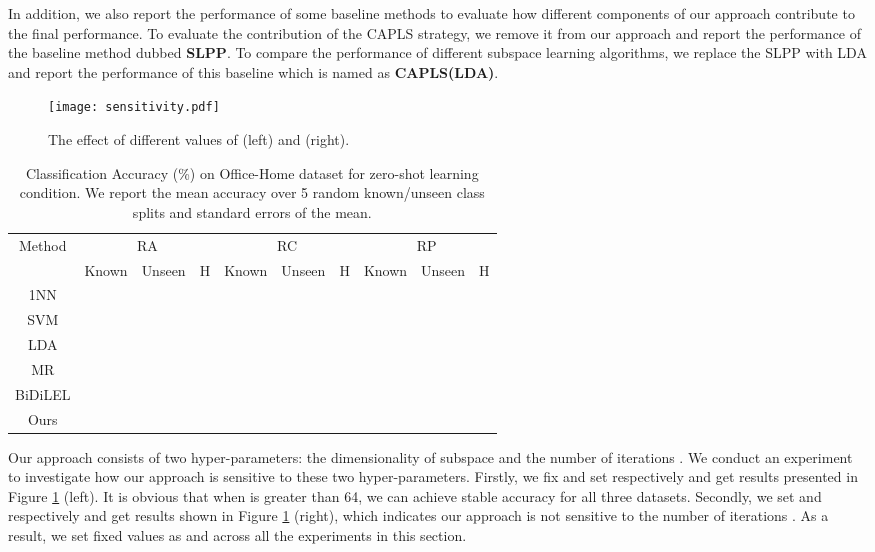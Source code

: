 \documentclass[conference]{IEEEtran}
\begin{document}
In addition, we also report the performance of some baseline methods to evaluate how different components of our approach contribute to the final performance. To evaluate the contribution of the CAPLS strategy, we remove it from our approach and report the performance of the baseline method dubbed \textbf{SLPP}. To compare the performance of different subspace learning algorithms, we replace the SLPP with LDA and report the performance of this baseline which is named as \textbf{CAPLS(LDA)}.


\begin{figure}
	\centering
	{\texttt{[image: sensitivity.pdf]}}
	{\caption{The effect of different values of  (left) and (right).}
		\label{fig:sensitivity}}
\end{figure}

\begin{table*}[!htbp]
	\centering
	{\centering
		\caption[]{Classification Accuracy (\%) on Office-Home dataset for zero-shot learning condition. We report the mean accuracy over 5 random known/unseen class splits and standard errors of the mean. \\	}
		\label{table:zsl_o65}
		\begin{lrbox}{\tablebox}
			\begin{tabular}{c|ccc|ccc|ccc}
				\hline
				\multirow{2}{*}{Method} & \multicolumn{3}{c|}{RA}& \multicolumn{3}{c|}{RC}& \multicolumn{3}{c}{RP}\\ \cline{2-10}
				& Known & Unseen & H & Known & Unseen & H &Known & Unseen & H\\
				\hline
				1NN &  & & &  & & & & & \\
				SVM &  & & & & & && &\\
				LDA & &  & && & & && \\
				MR \cite{xu2017transductive} & & & & & & & & & \\
				BiDiLEL\cite{wang2017zero} & & & & & & & && \\ \hline
				Ours & & & & & & & & &\\
				\hline
				\hline
			\end{tabular}
		\end{lrbox}
		\scalebox{0.9}{\usebox{\tablebox}}
	}
\end{table*}

Our approach consists of two hyper-parameters: the dimensionality of subspace  and the number of iterations . We conduct an experiment to investigate how our approach is sensitive to these two hyper-parameters. Firstly, we fix  and set  respectively and get results presented in Figure \ref{fig:sensitivity} (left). It is obvious that when  is greater than 64, we can achieve stable accuracy for all three datasets.  Secondly, we set  and  respectively and get results shown in Figure \ref{fig:sensitivity} (right), which indicates our approach is not sensitive to the number of iterations . As a result, we set fixed values as  and  across all the experiments in this section.
\end{document}
